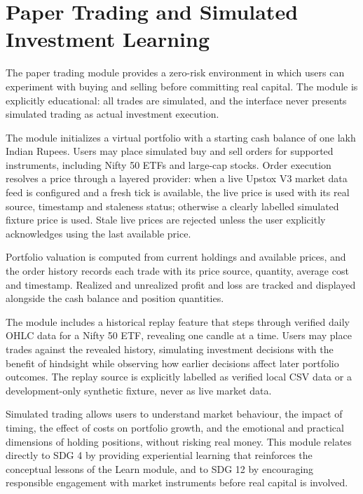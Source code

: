 \section{Paper Trading and Simulated Investment Learning}

The paper trading module provides a zero-risk environment in which users can experiment with buying and selling before committing real capital. The module is explicitly educational: all trades are simulated, and the interface never presents simulated trading as actual investment execution.

The module initializes a virtual portfolio with a starting cash balance of one lakh Indian Rupees. Users may place simulated buy and sell orders for supported instruments, including Nifty 50 ETFs and large-cap stocks. Order execution resolves a price through a layered provider: when a live Upstox V3 market data feed is configured and a fresh tick is available, the live price is used with its real source, timestamp and staleness status; otherwise a clearly labelled simulated fixture price is used. Stale live prices are rejected unless the user explicitly acknowledges using the last available price.

Portfolio valuation is computed from current holdings and available prices, and the order history records each trade with its price source, quantity, average cost and timestamp. Realized and unrealized profit and loss are tracked and displayed alongside the cash balance and position quantities.

The module includes a historical replay feature that steps through verified daily OHLC data for a Nifty 50 ETF, revealing one candle at a time. Users may place trades against the revealed history, simulating investment decisions with the benefit of hindsight while observing how earlier decisions affect later portfolio outcomes. The replay source is explicitly labelled as verified local CSV data or a development-only synthetic fixture, never as live market data.

Simulated trading allows users to understand market behaviour, the impact of timing, the effect of costs on portfolio growth, and the emotional and practical dimensions of holding positions, without risking real money. This module relates directly to SDG 4 by providing experiential learning that reinforces the conceptual lessons of the Learn module, and to SDG 12 by encouraging responsible engagement with market instruments before real capital is involved.
